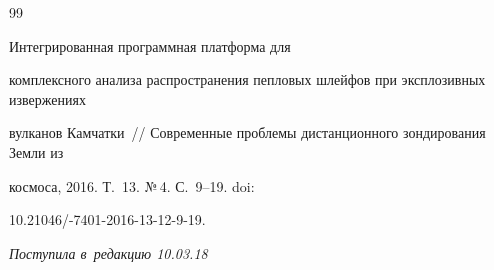 {{\begin{thebibliography}{99}


 Интегрированная программная платформа для 


комплексного анализа распространения пепловых шлейфов при эксплозивных извержениях 


вулканов Камчатки~/\!\!/ Современные проблемы дистанционного зондирования Земли из 


космоса, 2016. Т.~13. №\,4. С.~9--19. doi:  


10.21046\!/-7401-2016-13-12-9-19.





        \end{thebibliography}


} }








\vspace*{-9pt}





\hfill{\small\textit{Поступила в~редакцию 10.03.18}}





























\newpage





\vspace*{-28pt}










\vspace*{-3pt}











